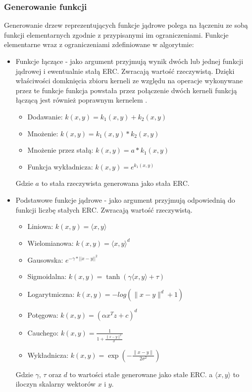 \subsubsection{Generowanie funkcji}
Generowanie drzew reprezentujących funkcje jądrowe polega na łączeniu ze sobą funkcji elementarnych zgodnie z  przypisanymi im ograniczeniami.
Funkcje elementarne wraz z ograniczeniami zdefiniowane w algorytmie:
\begin{itemize}
\item Funkcje łączące - jako argument przyjmują wynik dwóch lub jednej funkcji jądrowej i ewentualnie stałą ERC. Zwracają wartość rzeczywistą. Dzięki właściwości domknięcia zbioru kerneli ze względu na operacje wykonywane przez te funkcje funkcja powstała przez połączenie dwóch kerneli funkcją łączącą jest również poprawnym kernelem \cite{Shawe-Taylor:2004:KMP:975545}.
	\begin{itemize}
	\item Dodawanie: $ k(x, y) = k_1(x,y) + k_2(x,y) $
	\item Mnożenie: $ k(x, y) = k_1(x,y) * k_2(x,y) $	
	\item Mnożenie przez stałą: $ k(x, y) = a * k_1(x,y) $
	\item Funkcja wykładnicza: $ k(x, y) = e ^{k_1(x,y)} $
	\end{itemize}
	Gdzie $ a $ to stała rzeczywista generowana jako stała ERC.
\item Podstawowe funkcje jądrowe - jako argument przyjmują odpowiednią do funkcji liczbę stałych ERC. Zwracają wartość rzeczywistą.
	\begin{itemize}
	\item Liniowa: $ k(x, y) = \langle x,y \rangle $	
	\item Wielomianowa: $ k(x, y) = \langle x,y \rangle ^d $
	\item Gausowska: $ e^{-\gamma*||x-y||^2} $	
	\item Sigmoidalna: $ k(x, y) = \tanh(\gamma \langle x,y \rangle + \tau) $
	\item Logarytmiczna: $ k(x, y) = - log (\lVert x-y \rVert ^d + 1) $
	\item Potęgowa: $ k(x, y) = (\alpha x^T z + c)^d $
	\item Cauchego: $ k(x, y) = \frac{1}{1 + \frac{\lVert x-y \rVert^2}{\sigma} } $ 
	\item Wykładnicza: $ k(x, y) = \exp\left(-\frac{ \lVert x-y \rVert }{2\sigma^2}\right) $
	\end{itemize}
	Gdzie $ \gamma $, $ \tau $ oraz $ d $ to wartości stałe generowane jako stałe ERC. a $ \langle x,y \rangle $ to iloczyn skalarny wektorów $x$ i $y$.

\end{itemize}
